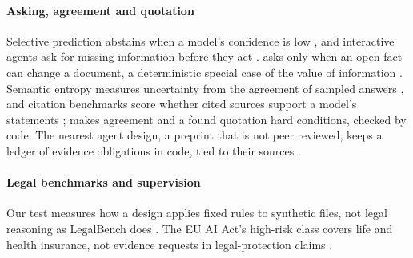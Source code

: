 \paragraph{Asking, agreement and quotation}
Selective prediction abstains when a model's confidence is low \cite{chow1970optimum,geifman2017selective,kamath2020selective,wen2025abstention}, and interactive agents ask for missing information before they act \cite{li2024mediq,zhang2024askbeforeplan}. \casepath asks only when an open fact can change a document, a deterministic special case of the value of information \cite{howard1966information}. Semantic entropy measures uncertainty from the agreement of sampled answers \cite{kuhn2023semantic,farquhar2024detecting}, and citation benchmarks score whether cited sources support a model's statements \cite{gao2023enabling}; \casepath makes agreement and a found quotation hard conditions, checked by code. The nearest agent design, a preprint that is not peer reviewed, keeps a ledger of evidence obligations in code, tied to their sources \cite{kim2026evidenceobligation}.

\paragraph{Legal benchmarks and supervision}
Our test measures how a design applies fixed rules to synthetic files, not legal reasoning as LegalBench does \cite{guha2023legalbench}. The EU AI Act's high-risk class covers life and health insurance, not evidence requests in legal-protection claims \cite{eu2024aiact}.

